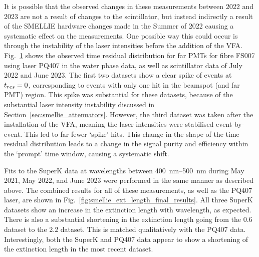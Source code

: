 It is possible that the observed changes in these measurements between 2022 and 2023 are not a result of changes to the scintillator, but instead indirectly a result of the SMELLIE hardware changes made in the Summer of 2022 causing a systematic effect on the measurements. One possible way this could occur is through the instability of the laser intensities before the addition of the VFA. Fig.~\ref{fig:smellie_ext_length_far_pmt_tres_plot_comparison} shows the observed time residual distribution for far PMTs for fibre FS007 using laser PQ407 in the water phase data, as well as scintillator data of July 2022 and June 2023. The first two datasets show a clear spike of events at $t_{res}{} = 0$, corresponding to events with only one hit in the beamspot (and far PMT) region. This spike was substantial for these datasets, because of the substantial laser intensity instability discussed in Section~\ref{sec:smellie_attenuators}. However, the third dataset was taken after the installation of the VFA, meaning the laser intensities were stabilised event-by-event. This led to far fewer `spike' hits. This change in the shape of the time residual distribution leads to a change in the signal purity and efficiency within the `prompt' time window, causing a systematic shift.

\begin{figure}
    \centering
    \caption[]{}
    \label{fig:smellie_ext_length_far_pmt_tres_plot_comparison}
\end{figure}

Fits to the SuperK data at wavelengths between \SIrange{400}{500}{\nm} during May 2021, May 2022, and June 2023 were performed in the same manner as described above. The combined results for all of these measurements, as well as the PQ407 laser, are shown in Fig.~\ref{fig:smellie_ext_length_final_results}. All three SuperK datasets show an increase in the extinction length with wavelength, as expected. There is also a substantial shortening in the extinction length going from the \SI{0.6}{\gpl} dataset to the \SI{2.2}{\gpl} dataset. This is matched qualitatively with the PQ407 data. Interestingly, both the SuperK and PQ407 data appear to show a shortening of the extinction length in the most recent dataset.

